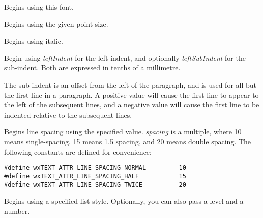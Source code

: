 Begins using this font.

\label{wxrichtextbufferbeginfontsize}


Begins using the given point size.

\label{wxrichtextbufferbeginitalic}


Begins using italic.

\label{wxrichtextbufferbeginleftindent}


Begin using {\it leftIndent} for the left indent, and optionally {\it leftSubIndent} for
the sub-indent. Both are expressed in tenths of a millimetre.

The sub-indent is an offset from the left of the paragraph, and is used for all but the
first line in a paragraph. A positive value will cause the first line to appear to the left
of the subsequent lines, and a negative value will cause the first line to be indented
relative to the subsequent lines.

\label{wxrichtextbufferbeginlinespacing}


Begins line spacing using the specified value. {\it spacing} is a multiple, where 10 means single-spacing,
15 means 1.5 spacing, and 20 means double spacing. The following constants are
defined for convenience:

{\small
\begin{verbatim}
#define wxTEXT_ATTR_LINE_SPACING_NORMAL         10
#define wxTEXT_ATTR_LINE_SPACING_HALF           15
#define wxTEXT_ATTR_LINE_SPACING_TWICE          20
\end{verbatim}
}

\label{wxrichtextbufferbeginliststyle}


Begins using a specified list style. Optionally, you can also pass a level and a number.

